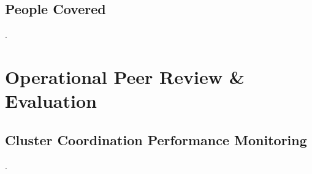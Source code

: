 \documentclass[
  a4paper,
  onecolumn,
  oneside]{book}
\begin{document}
\hypertarget{people-covered}{%
\section{People Covered}\label{people-covered}}

.

\hypertarget{operational-peer-review-evaluation}{%
\chapter{Operational Peer Review \&
Evaluation}\label{operational-peer-review-evaluation}}

\hypertarget{cluster-coordination-performance-monitoring}{%
\section{Cluster Coordination Performance
Monitoring}\label{cluster-coordination-performance-monitoring}}

.


\backmatter
\end{document}
